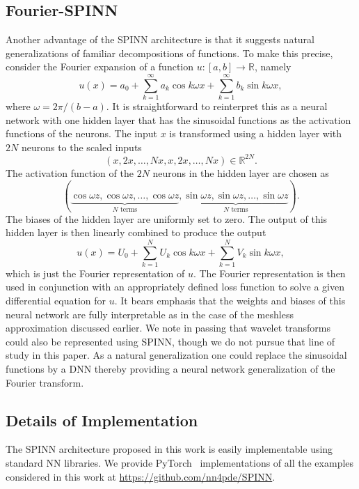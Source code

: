 \documentclass[12pt]{article}
\begin{document}
\subsection{Fourier-SPINN}
Another advantage of the SPINN architecture is that it suggests natural generalizations of familiar decompositions of functions. To make this precise, consider the Fourier expansion of a function $u:[a,b] \to \mathbb{R}$, namely
\begin{displaymath}
u(x) = a_0 + \sum_{k=1}^{\infty} a_k \cos k\omega x + \sum_{k=1}^{\infty} b_k \sin k\omega x,
\end{displaymath}
where $\omega = 2\pi/(b - a)$. It is straightforward to reinterpret this as a neural network with one hidden layer that has the sinusoidal functions as the activation functions of the neurons. The input $x$ is transformed using a hidden layer with $2N$ neurons to the scaled inputs
\begin{displaymath}
(x, 2x, \ldots, Nx, x, 2x, \ldots, Nx) \in \mathbb{R}^{2N}.
\end{displaymath}
The activation function of the $2N$ neurons in the hidden layer are chosen as
\begin{displaymath}
(\underbrace{\cos \omega z, \cos \omega z, \ldots, \cos \omega z}_{\text{$N$ terms}}, \underbrace{\sin \omega z, \sin \omega z, \ldots, \sin \omega z}_{\text{$N$ terms}}).
\end{displaymath}
The biases of the hidden layer are uniformly set to zero. The output of this hidden layer is then linearly combined to produce the output
\begin{displaymath}
u(x) = U_0 + \sum_{k=1}^N U_k \cos k\omega x + \sum_{k=1}^N V_k \sin k\omega x,
\end{displaymath}
which is just the Fourier representation of $u$. The Fourier representation is then used in conjunction with an appropriately defined loss function to solve a given differential equation for $u$. It bears emphasis that the weights and biases of this neural network are fully interpretable as in the case of the meshless approximation discussed earlier. We note in passing that wavelet transforms could also be represented using SPINN, though we do not pursue that line of study in this paper. As a natural generalization one could replace the sinusoidal functions by a DNN thereby providing a neural network generalization of the Fourier transform.

\subsection{Details of Implementation}
The SPINN architecture proposed in this work is easily implementable using standard NN libraries. We provide PyTorch~\cite{pytorch} implementations of all the examples considered in this work at \url{https://github.com/nn4pde/SPINN}.
\end{document}
